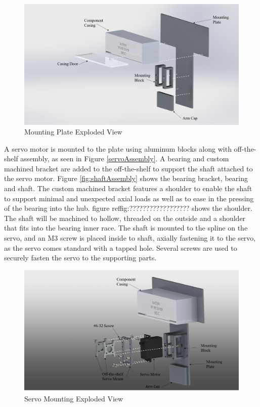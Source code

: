 \documentclass[../main.tex]{subfiles}
\begin{document}
\begin{figure}[H]
	\centering
	\includegraphics[width=.8\linewidth]{img/design/thruster/plateAssembly.png}
	\caption{Mounting Plate Exploded View}
	\label{fig:plateAssembly}
\end{figure}

 A servo motor is mounted to the plate using aluminum blocks along with off-the-shelf assembly, as seen in Figure \ref{servoAssembly}. A bearing and custom machined bracket are added to the off-the-shelf to support the shaft attached to the servo motor. Figure \ref{fig:shaftAssembly} shows the bearing bracket, bearing and shaft. The custom machined bracket features a shoulder to enable the shaft to support minimal and unexpected axial loads as well as to ease in the pressing of the bearing into the hub. figure ref{fig:??????????????????} shows the shoulder. The shaft will be machined to hollow, threaded on the outside and a shoulder that fits into the bearing inner race. The shaft is mounted to the spline on the servo, and an M3 screw is placed inside to shaft, axially fastening it to the servo, as the servo comes standard with a tapped hole. Several screws are used to securely fasten the servo to the supporting parts.
 \\
 
 \begin{figure}[H]
 	\centering
 	\includegraphics[width=.8\linewidth]{img/design/thruster/servoAssembly.png}
 	\caption{Servo Mounting Exploded View}
 	\label{fig:servoAssembly}
 \end{figure}
 
\end{document}
